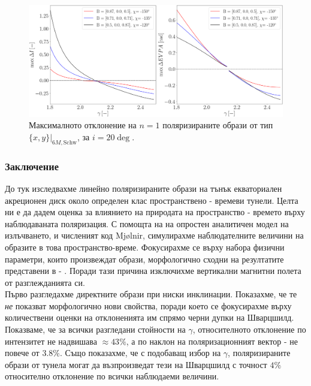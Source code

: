 \begin{figure}[!htb]
	\centering
	\includegraphics[scale = 0.25]{WH_20_deg_param_sweep_n1.png}
	\caption[Максималното отклонение на $n=1$ поляризираните образи от тип $\{x,y\}\vert_{6M, \text{Schw}}$, за $i = 20\deg$]{Максималното отклонение на $n=1$ поляризираните образи от тип $\{x,y\}\vert_{6M, \text{Schw}}$, за $i = 20\deg$.} 
	\label{WH_max_deviation_20_deg_n1}
\end{figure}
\newpage

\subsubsection{Заключение}

До тук изследвахме линейно поляризираните образи на тънък екваториален акреционен диск около определен клас пространствено - времеви тунели. Целта ни е да дадем оценка за влиянието на природата на пространство - времето върху наблюдаваната поляризация. С помощта на на опростен аналитичен модел на излъчването, и численият код Mjølnir, симулирахме наблюдателните величини на образите в това пространство-време. Фокусирахме се върху набора физични параметри, които произвеждат образи, морфологично сходни на резултатите представени в \cite{EHT_M87_I} - \cite{EHT_M87_VIII}. Поради тази причина изключихме вертикални магнитни полета от разглежданията си.\\

Първо разгледахме директните образи при ниски инклинации. Показахме, че те \emph{не} показват морфологично нови свойства, поради което се фокусирахме върху количествени оценки на отклоненията им спрямо черни дупки на Шварцшилд. Показваме, че за всички разгледани стойности на $\gamma$, относителното отклонение по интензитет не надвишава $\approx 43\%$, а по наклон на поляризационният вектор - не повече от $3.8\%$. Също показахме, че с подобаващ избор на $\gamma$, поляризираните образи от тунела могат да възпроизведат тези на Шварцшилд с точност $4\%$ относително отклонение по всички наблюдаеми величини. \\

